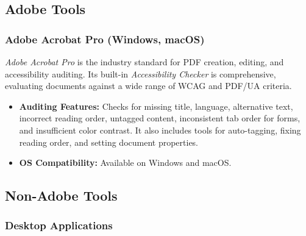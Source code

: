 \subsection{Adobe Tools}
\label{subsec:adobe-tools}

\subsubsection{Adobe Acrobat Pro (Windows, macOS)}
\label{subsubsec:acrobat-pro}

\emph{Adobe Acrobat Pro} is the industry standard for PDF creation, editing, and accessibility auditing. Its built-in \emph{Accessibility Checker} is comprehensive, evaluating documents against a wide range of WCAG and PDF/UA criteria.

\begin{itemize}

\item \textbf{Auditing Features:} Checks for missing title, language, alternative text, incorrect reading order, untagged content, inconsistent tab order for forms, and insufficient color contrast. \cite{AdobeAccessGuide} It also includes tools for auto-tagging, fixing reading order, and setting document properties.
\item \textbf{OS Compatibility:} Available on Windows and macOS.

\end{itemize}

\subsection{Non-Adobe Tools}
\label{subsec:non-adobe-tools}

\subsubsection{Desktop Applications}
\label{subsubsec:desktop-apps}

